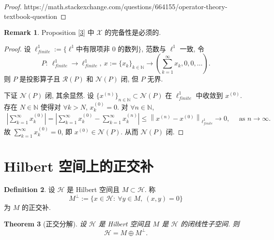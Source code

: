 \documentclass[a4paper,11pt]{article}
\newtheorem{theorem}{Theorem}[section]
\theoremstyle{definition}
\newtheorem{remark}[theorem]{Remark}
\newtheorem{definition}[theorem]{Definition}
\begin{document}
\begin{CJK*}{UTF8}{gbsn}
\begin{proof}
    https://math.stackexchange.com/questions/664155/operator-theory-textbook-question
\end{proof}

\begin{remark}
    Proposition \ref{3} 中 $ \mathcal{X} $ 的完备性是必须的.
\end{remark}

\begin{proof}
    设 $ \ell_{finite}^1 := \{ \ell^1 \text{中有限项非 0 的数列} \} $, 范数与 $ \ell^1 $ 一致, 令
    $$
        P :\ \ell_{finite}^1 \to \ell_{finite}^1,\ 
            x:= \{x_k\}_{k \in \mathbb{N}} \to \left( \sum_{k = 1}^\infty x_k, 0, 0, \ldots \right).
    $$
    则 $ P $ 是投影算子且 $ \mathcal{R}(P) $ 和 $ \mathcal{N}(P) $ 闭, 但 $ P $ 无界. 
    
    下证 $ \mathcal{N}(P) $ 闭, 其余显然.
    设 $ \{x^{(n)}\}_{n \in \mathbb{N}} \subset \mathcal{N}(P) $ 在 $ \ell_{finite}^1 $ 中收敛到 $ x^{(0)} $.
    存在 $ N \in \mathbb{N} $ 使得对 $ \forall k > N $, $ x^{(0)}_k = 0 $.
    对 $ \forall n \in \mathbb{N} $,
    \begin{align*}
        \left| \sum_{k = 1}^\infty x^{(0)}_k \right|
            = \left| \sum_{k = 1}^\infty x^{(0)}_k - \sum_{k = 1}^\infty x^{(n)}_k \right| 
            \leq \left\| x^{(n)} - x^{(0)} \right\|_{\ell_{finite}^1}
            \to 0, \quad \text{ as } n \to \infty.
    \end{align*}
    故 $ \sum_{k = 1}^\infty x^{(0)}_k = 0 $, 即 $ x^{(0)} \in \mathcal{N}(P) $.
    从而 $ \mathcal{N}(P) $ 闭.
\end{proof}

\section{Hilbert 空间上的正交补}

\begin{definition}
    设 $ \mathcal{H} $ 是 Hilbert 空间且 $ M \subset \mathcal{H} $. 称
    $$
        M^\bot := \{ x \in \mathcal{H} :\ \forall y \in M,\ (x, y) = 0 \}
    $$
    为 $ M $ 的正交补.
\end{definition}

\begin{theorem}[正交分解]
    设 $ \mathcal{H} $ 是 Hilbert 空间且 $ M $ 是 $ \mathcal{H} $ 的闭线性子空间. 则
    $$
        \mathcal{H} = M \oplus M^\bot.
    $$
\end{theorem}


\end{CJK*}
\end{document}
